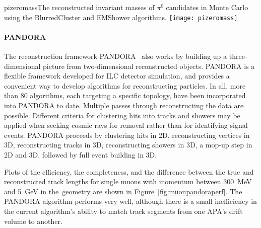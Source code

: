 \begin{cdrfigure}{pizeromass}{The reconstructed invariant masses of $\pi^0$ candidates in
  Monte Carlo using the BlurredCluster and EMShower algorithms.}
\texttt{[image: pizeromass]}
\end{cdrfigure}

\paragraph{PANDORA}
The reconstruction framework PANDORA~\cite{Marshall:2015rfa} also works by
building up a three-dimensional picture from two-dimensional
reconstructed objects.  PANDORA is a flexible framework developed for
ILC detector simulation, and provides a convenient way to develop
algorithms for reconstructing particles.  In all, more than 80
algorithms, each targeting a specific topology, have been incorporated
into PANDORA to date.  Multiple passes through reconstructing the data
are possible.  Different criteria for clustering hits into tracks and
showers may be applied when seeking cosmic rays for removal rather than for
identifying signal events.  PANDORA proceeds by clustering hits in 2D,
reconstructing vertices in 3D, reconstructing tracks in 3D,
reconstructing showers in 3D, a mop-up step in 2D and 3D, followed by
full event building in 3D.




Plots of the efficiency, the completeness, and the  difference between the true and reconstructed
track lengths for single muons with momentum between 300~MeV and 5~GeV in the~\pdsp geometry are
shown in Figure~\ref{fig:muonpandoraperf}.  The PANDORA algorithm performs very well, although there is a small
inefficiency in the current algorithm's ability to match track segments from one APA's drift volume to another.

